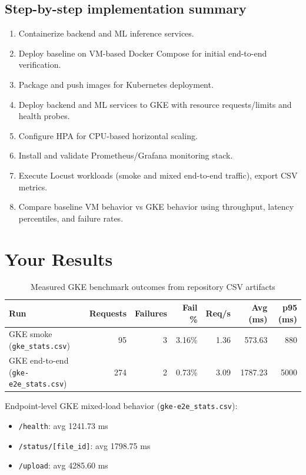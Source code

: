 \documentclass[11pt,a4paper]{article}
\begin{document}
\subsection*{Step-by-step implementation summary}
\begin{enumerate}
    \item Containerize backend and ML inference services.
    \item Deploy baseline on VM-based Docker Compose for initial end-to-end verification.
    \item Package and push images for Kubernetes deployment.
    \item Deploy backend and ML services to GKE with resource requests/limits and health probes.
    \item Configure HPA for CPU-based horizontal scaling.
    \item Install and validate Prometheus/Grafana monitoring stack.
    \item Execute Locust workloads (smoke and mixed end-to-end traffic), export CSV metrics.
    \item Compare baseline VM behavior vs GKE behavior using throughput, latency percentiles, and failure rates.
\end{enumerate}

\section{Your Results}
\begin{table}[H]
\centering
\caption{Measured GKE benchmark outcomes from repository CSV artifacts}
\begin{tabular}{lrrrrrr}
\toprule
\textbf{Run} & \textbf{Requests} & \textbf{Failures} & \textbf{Fail \%} & \textbf{Req/s} & \textbf{Avg (ms)} & \textbf{p95 (ms)} \\
\midrule
GKE smoke (\texttt{gke\_stats.csv}) & 95 & 3 & 3.16\% & 1.36 & 573.63 & 880 \\
GKE end-to-end (\texttt{gke-e2e\_stats.csv}) & 274 & 2 & 0.73\% & 3.09 & 1787.23 & 5000 \\
\bottomrule
\end{tabular}
\end{table}

Endpoint-level GKE mixed-load behavior (\texttt{gke-e2e\_stats.csv}):
\begin{itemize}
    \item \texttt{/health}: avg 1241.73 ms
    \item \texttt{/status/[file\_id]}: avg 1798.75 ms
    \item \texttt{/upload}: avg 4285.60 ms
\end{itemize}
\end{document}
